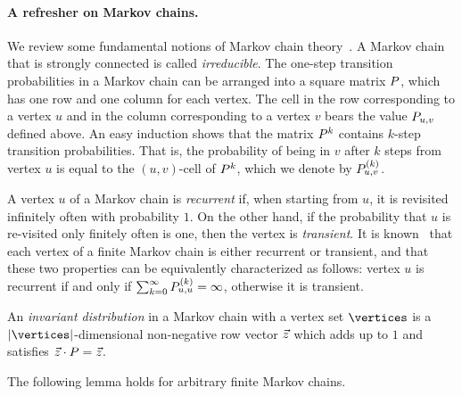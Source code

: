 \paragraph{A refresher on Markov chains.} We review some fundamental notions of Markov chain theory~\cite{Norris:1998}. A Markov chain that is strongly connected is called \emph{irreducible}. The one-step transition probabilities in a Markov chain can be arranged into a square matrix $P$, which has one row and one column for each vertex. The cell in the row corresponding to a vertex $u$ and in the column corresponding to a vertex $v$ bears the value $P_{u,v}$ defined above. An easy induction shows that the matrix $P^k$ contains $k$-step transition probabilities. That is, the probability of being in $v$ after $k$ steps from vertex $u$ is equal to the $(u,v)$-cell of $P^k$, which we denote by $P^{(k)}_{u,v}$.

A vertex $u$ of a Markov chain is \emph{recurrent} if, when starting from $u$, it is revisited infinitely often with probability $1$. On the other hand, if the probability that $u$ is re-visited only finitely often is one, then the vertex is \emph{transient}. It is known~\cite[Theorem 1.5.3]{Norris:1998} that each vertex of a finite Markov chain is either recurrent or transient, and that these two properties can be equivalently characterized as follows: vertex $u$ is recurrent if and only if  $\sum_{k=0}^{\infty}P^{(k)}_{u,u}=\infty$, otherwise it is transient.

An \emph{invariant distribution} in a Markov chain with a vertex set $\vertices$ is a $|\vertices|$-dimensional non-negative row vector $\vec{z}$ which adds up to $1$ and satisfies $ \vec{z}\cdot P = \vec{z}$.

The following lemma holds for arbitrary finite Markov chains.

